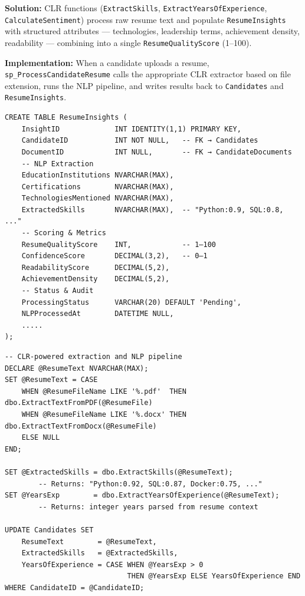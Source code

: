 \documentclass[11pt,a4paper]{article}
\begin{document}
\textbf{Solution:} CLR functions (\texttt{ExtractSkills}, \texttt{ExtractYearsOfExperience}, \texttt{CalculateSentiment}) process raw resume text and populate \texttt{ResumeInsights} with structured attributes --- technologies, leadership terms, achievement density, readability --- combining into a single \texttt{ResumeQualityScore} (1--100).

\textbf{Implementation:} When a candidate uploads a resume, \texttt{sp\_ProcessCandidateResume} calls the appropriate CLR extractor based on file extension, runs the NLP pipeline, and writes results back to \texttt{Candidates} and \texttt{ResumeInsights}.

\begin{verbatim}
CREATE TABLE ResumeInsights (
    InsightID             INT IDENTITY(1,1) PRIMARY KEY,
    CandidateID           INT NOT NULL,   -- FK → Candidates
    DocumentID            INT NULL,       -- FK → CandidateDocuments
    -- NLP Extraction
    EducationInstitutions NVARCHAR(MAX),
    Certifications        NVARCHAR(MAX),
    TechnologiesMentioned NVARCHAR(MAX),
    ExtractedSkills       NVARCHAR(MAX),  -- "Python:0.9, SQL:0.8, ..."
    -- Scoring & Metrics
    ResumeQualityScore    INT,            -- 1–100
    ConfidenceScore       DECIMAL(3,2),   -- 0–1
    ReadabilityScore      DECIMAL(5,2),
    AchievementDensity    DECIMAL(5,2),
    -- Status & Audit
    ProcessingStatus      VARCHAR(20) DEFAULT 'Pending',
    NLPProcessedAt        DATETIME NULL,
    .....
);
\end{verbatim}
\begin{verbatim}
-- CLR-powered extraction and NLP pipeline
DECLARE @ResumeText NVARCHAR(MAX);
SET @ResumeText = CASE
    WHEN @ResumeFileName LIKE '%.pdf'  THEN dbo.ExtractTextFromPDF(@ResumeFile)
    WHEN @ResumeFileName LIKE '%.docx' THEN dbo.ExtractTextFromDocx(@ResumeFile)
    ELSE NULL
END;

SET @ExtractedSkills = dbo.ExtractSkills(@ResumeText);
        -- Returns: "Python:0.92, SQL:0.87, Docker:0.75, ..."
SET @YearsExp        = dbo.ExtractYearsOfExperience(@ResumeText);
        -- Returns: integer years parsed from resume context

UPDATE Candidates SET
    ResumeText        = @ResumeText,
    ExtractedSkills   = @ExtractedSkills,
    YearsOfExperience = CASE WHEN @YearsExp > 0
                             THEN @YearsExp ELSE YearsOfExperience END
WHERE CandidateID = @CandidateID;
\end{verbatim}
\end{document}
